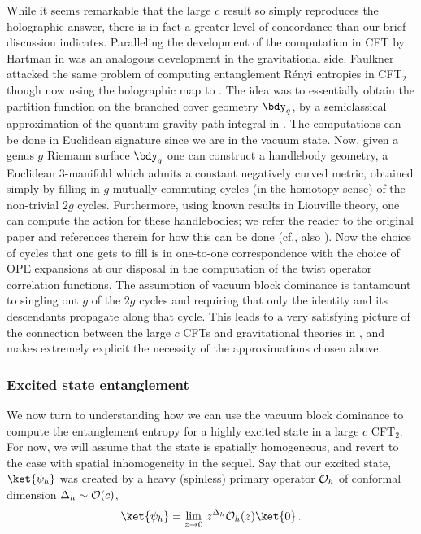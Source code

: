 \documentclass[12pt,openany]{book}
\begin{document}
While it seems remarkable that the large $c$ result so simply reproduces the holographic answer, there is in fact a greater level of concordance than our brief discussion indicates. Paralleling the development of the computation in CFT by Hartman in \cite{Hartman:2013mia} was an analogous development in the gravitational side. Faulkner \cite{Faulkner:2013yia} attacked the same problem of computing entanglement R\'enyi entropies in CFT$_2$ though now using the holographic map to . The idea was to essentially obtain the partition function on the branched cover geometry $\bdy_q$,  by a semiclassical approximation of the quantum gravity path integral in . The computations can be done in Euclidean signature since we are in the vacuum state. Now, given a genus $g$ Riemann surface $\bdy_q$ one can construct a handlebody geometry, a Euclidean 3-manifold which admits a constant negatively curved metric, obtained simply by filling in $g$ mutually commuting cycles (in the homotopy sense) of the non-trivial $2g$ cycles. Furthermore, using known results in Liouville theory, one can  compute the action for these handlebodies; we refer the reader to the original paper and references therein for how this can be done (cf., also \cite{Krasnov:2000zq}).
Now the choice of cycles that one gets to fill is in one-to-one correspondence with the choice of OPE expansions at our disposal in the computation of the twist operator correlation functions. The assumption of vacuum block dominance is tantamount to singling out $g$ of the $2g$ cycles and requiring that only the identity and its descendants propagate along that cycle. This leads to a very satisfying picture of the connection between the large $c$ CFTs and gravitational theories in , and makes extremely explicit the necessity of the approximations chosen above.

\subsubsection{Excited state entanglement}
\label{sec:Hcft2}


We now turn to understanding how we can use the vacuum block dominance to compute the entanglement entropy for a highly excited state in a large $c$ CFT$_2$. For now, we will assume that the state is spatially homogeneous, and revert to the case with spatial inhomogeneity in the sequel. Say that our excited state, $\ket{\psi_h}$ was  created by a heavy (spinless) primary operator
${\cal O}_h$ of conformal  dimension $\Delta_h \sim {\cal O}(c)$,
%
\begin{equation}
\ket{\psi_h}=\lim_{z\to 0}\, z^{\Delta_h} {\cal O}_h(z)\ket{0} \,.
\end{equation}
%
\end{document}
